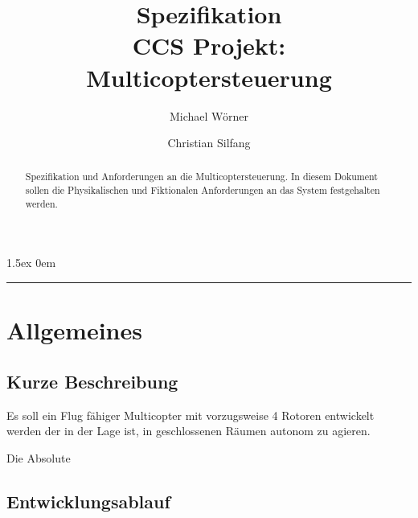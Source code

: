 \documentclass[a4paper,12pt]{article}
\begin{document}
\title{
\textbf{Spezifikation}\\
CCS Projekt: Multicoptersteuerung}
\author{Michael Wörner \and Christian Silfang}
\date{}

\parskip1.5ex
\parindent0em

\maketitle

\begin{abstract}
Spezifikation und Anforderungen an die \glqq Multicoptersteuerung\grqq. In diesem Dokument sollen die
Physikalischen und Fiktionalen Anforderungen an das System festgehalten werden. 
\end{abstract}


\noindent\rule[1ex]{\textwidth}{1pt}
\tableofcontents
\newpage
\section{Allgemeines}
\subsection{Kurze Beschreibung}
	Es soll ein Flug fähiger Multicopter mit vorzugsweise 4 Rotoren entwickelt werden der in der Lage ist,
	in geschlossenen Räumen autonom zu agieren. 
	
	Die Absolute
	
\subsection{Entwicklungsablauf}
	
\end{document}
